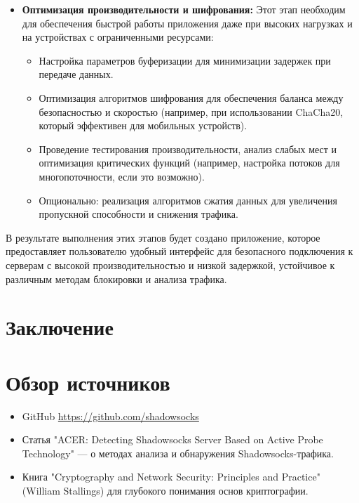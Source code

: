 \documentclass{SCWorks}
\begin{document}
\begin{itemize}
    \item \textbf{Оптимизация производительности и шифрования:}  
    Этот этап необходим для обеспечения быстрой работы приложения даже при высоких нагрузках и на устройствах с ограниченными ресурсами:
    \begin{itemize}
        \item Настройка параметров буферизации для минимизации задержек при передаче данных.
        \item Оптимизация алгоритмов шифрования для обеспечения баланса между безопасностью и скоростью (например, при использовании ChaCha20, который эффективен для мобильных устройств).
        \item Проведение тестирования производительности, анализ слабых мест и оптимизация критических функций (например, настройка потоков для многопоточности, если это возможно).
        \item Опционально: реализация алгоритмов сжатия данных для увеличения пропускной способности и снижения трафика.
    \end{itemize}
\end{itemize}

В результате выполнения этих этапов будет создано приложение, которое предоставляет пользователю удобный интерфейс для безопасного подключения к серверам с высокой производительностью и низкой задержкой, устойчивое к различным методам блокировки и анализа трафика.


\section*{Заключение}

\newpage

\section*{Обзор источников}

\begin{itemize}
    \item GitHub \url{https://github.com/shadowsocks}
    \item Статья "ACER: Detecting Shadowsocks Server Based on Active Probe Technology" --- о методах анализа и обнаружения Shadowsocks-трафика.
    \item Книга "Cryptography and Network Security: Principles and Practice" (William Stallings) для глубокого понимания основ криптографии.
\end{itemize}
\end{document}

